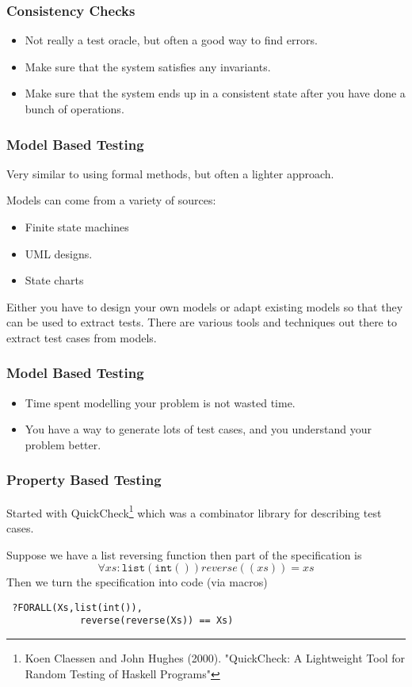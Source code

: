 \documentclass{beamer}
\begin{document}
\begin{frame}
  \frametitle{Consistency Checks}

  \begin{itemize}
  \item   Not really a test oracle, but often a good way to find errors.
  \item Make sure that the system satisfies any invariants.
  \item Make sure that the system ends up in a consistent state after you have
    done a bunch of operations.
  \end{itemize}
\end{frame}
\begin{frame}
  \frametitle{Model Based Testing}
  Very similar to using formal methods, but  often a lighter approach.

  Models can come from a variety of sources:
  \begin{itemize}
  \item Finite state machines
  \item UML designs.
  \item State charts
  \end{itemize}
  Either you have to design your own models or adapt existing models so that
  they can be used to extract tests. There are various tools and techniques
  out there to extract test cases from models.
  
\end{frame}
\begin{frame}
  \frametitle{Model Based Testing}
  \begin{itemize}
  \item Time spent modelling your problem is not wasted time.
  \item You have a way to generate lots of test cases, and you understand your
    problem better.
  \end{itemize}
\end{frame}
\begin{frame}[fragile]
  \frametitle{Property Based Testing}
Started with QuickCheck\footnote{Koen Claessen and John Hughes
  (2000). "QuickCheck: A Lightweight Tool for Random Testing of Haskell
  Programs"} which was a combinator library for describing test cases.


Suppose we have a list reversing function then part of the  specification is
\[
  \forall xs:\mathtt{list(int())} reverse((xs))=xs
\]
Then we turn the specification into code (via macros)
\begin{verbatim}
 ?FORALL(Xs,list(int()),
             reverse(reverse(Xs)) == Xs)
\end{verbatim}

\end{frame}
\end{document}
